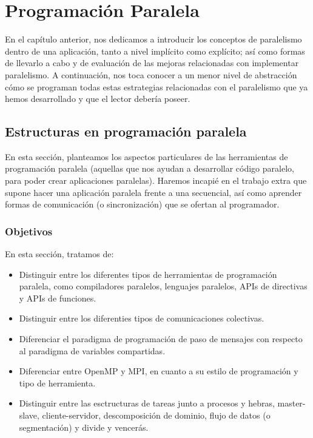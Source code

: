\chapter{Programación Paralela}

En el capítulo anterior, nos dedicamos a introducir los conceptos de paralelismo dentro de una aplicación, tanto a nivel implícito como explícito; así como formas de llevarlo a cabo y de evaluación de las mejoras relacionadas con implementar paralelismo. A continuación, nos toca conocer a un menor nivel de abstracción cómo se programan todas estas estrategias relacionadas con el paralelismo que ya hemos desarrollado y que el lector debería poseer.

\section{Estructuras en programación paralela}
En esta sección, planteamos los aspectos particulares de las herramientas de programación paralela (aquellas que nos ayudan a desarrollar código paralelo, para poder crear aplicaciones paralelas). Haremos incapié en el trabajo extra que supone hacer una aplicación paralela frente a una secuencial, así como aprender formas de comunicación (o sincronización) que se ofertan al programador.

\subsection{Objetivos}
En esta sección, tratamos de:
\begin{itemize}
    \item Distinguir entre los diferentes tipos de herramientas de programación paralela, como compiladores paralelos, lenguajes paralelos, APIs de directivas y APIs de funciones.
    \item Distinguir entre los diferenties tipos de comunicaciones colectivas.
    \item Diferenciar el paradigma de programación de paso de mensajes con respecto al paradigma de variables compartidas.
    \item Diferenciar entre OpenMP y MPI, en cuanto a su estilo de programación y tipo de herramienta.
    \item Distinguir entre las esctructuras de tareas junto a procesos y hebras, master-slave, cliente-servidor, descomposición de dominio, flujo de datos (o segmentación) y divide y vencerás.
\end{itemize}

